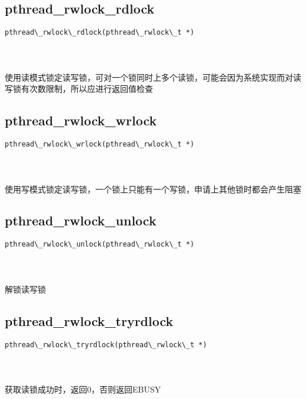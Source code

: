 \documentclass[10pt,a4paper]{article}
\begin{document}
\subsection{pthread\_rwlock\_rdlock}
\begin{spacing}{2.0}
\lstset{language=C,numbers=none}
\begin{lstlisting}
pthread\_rwlock\_rdlock(pthread\_rwlock\_t *)
\end{lstlisting}
{\large\color[rgb]{0.2,0.4,0.6}{*:}}
\paragraph{ \ \ }使用读模式锁定读写锁，可对一个锁同时上多个读锁，可能会因为系统实现而对读写锁有次数限制，所以应进行返回值检查
\end{spacing}

\subsection{pthread\_rwlock\_wrlock}
\begin{spacing}{2.0}
\lstset{language=C,numbers=none}
\begin{lstlisting}
pthread\_rwlock\_wrlock(pthread\_rwlock\_t *)
\end{lstlisting}
{\large\color[rgb]{0.2,0.4,0.6}{*:}}
\paragraph{ \ \ }使用写模式锁定读写锁，一个锁上只能有一个写锁，申请上其他锁时都会产生阻塞
\end{spacing}

\subsection{pthread\_rwlock\_unlock}
\begin{spacing}{2.0}
\lstset{language=C,numbers=none}
\begin{lstlisting}
pthread\_rwlock\_unlock(pthread\_rwlock\_t *)
\end{lstlisting}
{\large\color[rgb]{0.2,0.4,0.6}{*:}}
\paragraph{ \ \ }解锁读写锁
\end{spacing}

\subsection{pthread\_rwlock\_tryrdlock}
\begin{spacing}{2.0}
\lstset{language=C,numbers=none}
\begin{lstlisting}
pthread\_rwlock\_tryrdlock(pthread\_rwlock\_t *)
\end{lstlisting}
{\large\color[rgb]{0.2,0.4,0.6}{*:}}
\paragraph{ \ \ }获取读锁成功时，返回0，否则返回EBUSY
\end{spacing}
\end{document}
